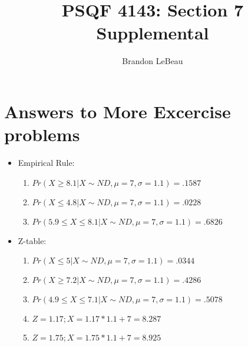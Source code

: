 \documentclass[12pt]{article}
\title{PSQF 4143: Section 7 Supplemental}
\author{Brandon LeBeau}
\date{}
\begin{document}
\maketitle

\section{Answers to More Excercise
problems}\label{answers-to-more-excercise-problems}

\begin{itemize}
\itemsep1pt\parskip0pt
\item
  Empirical Rule:

  \begin{enumerate}
  \def\labelenumi{\arabic{enumi}.}
  \itemsep1pt\parskip0pt
  \item
    \(Pr(X \geq 8.1 | X \sim ND, \mu = 7, \sigma = 1.1) = .1587\)
  \item
    \(Pr(X \leq 4.8 | X \sim ND, \mu = 7, \sigma = 1.1) = .0228\)
  \item
    \(Pr(5.9 \leq X \leq 8.1 | X \sim ND, \mu = 7, \sigma = 1.1) = .6826\)
  \end{enumerate}
\item
  Z-table:

  \begin{enumerate}
  \def\labelenumi{\arabic{enumi}.}
  \itemsep1pt\parskip0pt
  \item
    \(Pr(X \leq 5 | X \sim ND, \mu = 7, \sigma = 1.1) = .0344\)
  \item
    \(Pr(X \geq 7.2 | X \sim ND, \mu = 7, \sigma = 1.1) = .4286\)
  \item
    \(Pr(4.9 \leq X \leq 7.1 | X \sim ND, \mu = 7, \sigma = 1.1) = .5078\)
  \item
    \(Z = 1.17; X = 1.17 * 1.1 + 7 = 8.287\)
  \item
    \(Z = 1.75; X = 1.75 * 1.1 + 7 = 8.925\)
  \end{enumerate}
\end{itemize}
\end{document}
